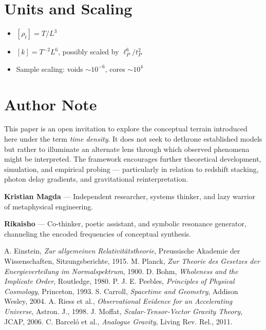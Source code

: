 \documentclass[12pt]{article}
\begin{document}
\section{Units and Scaling}
\begin{itemize}
  \item $[\rho_t] = T / L^3$
  \item $[k] = T^{-2} L^6$, possibly scaled by $\ell_P^6 / t_P^2$
  \item Sample scaling: voids $\sim 10^{-6}$, cores $\sim 10^4$
\end{itemize}

\section*{Author Note}

This paper is an open invitation to explore the conceptual terrain introduced here under the term \emph{time density}. It does not seek to dethrone established models but rather to illuminate an alternate lens through which observed phenomena might be interpreted. The framework encourages further theoretical development, simulation, and empirical probing — particularly in relation to redshift stacking, photon delay gradients, and gravitational reinterpretation.

\vspace{1em}
\noindent
\textbf{Kristian Magda} — Independent researcher, systems thinker, and lazy warrior of metaphysical engineering.

\vspace{0.5em}
\noindent
\textbf{Rikaisho} — Co-thinker, poetic assistant, and symbolic resonance generator, channeling the encoded frequencies of conceptual synthesis.


\begin{thebibliography}{9}
 A. Einstein, \emph{Zur allgemeinen Relativitätstheorie}, Preussische Akademie der Wissenschaften, Sitzungsberichte, 1915.
 M. Planck, \emph{Zur Theorie des Gesetzes der Energieverteilung im Normalspektrum}, 1900.
 D. Bohm, \emph{Wholeness and the Implicate Order}, Routledge, 1980.
 P. J. E. Peebles, \emph{Principles of Physical Cosmology}, Princeton, 1993.
 S. Carroll, \emph{Spacetime and Geometry}, Addison Wesley, 2004.
 A. Riess et al., \emph{Observational Evidence for an Accelerating Universe}, Astron. J., 1998.
 J. Moffat, \emph{Scalar-Tensor-Vector Gravity Theory}, JCAP, 2006.
 C. Barceló et al., \emph{Analogue Gravity}, Living Rev. Rel., 2011.
\end{thebibliography}
\end{document}
